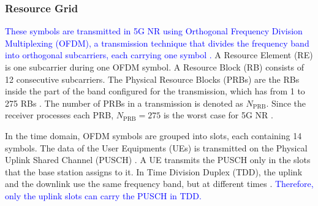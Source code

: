 \subsubsection{Resource Grid}\label{subsubsec:grade-recursos}
\textcolor{blue}{These symbols are transmitted in 5G NR using Orthogonal Frequency Division Multiplexing (OFDM), a transmission technique that divides the frequency band into orthogonal subcarriers, each carrying one symbol \cite{tse-viswanath}.} A Resource Element (RE) is one subcarrier during one OFDM symbol. A Resource Block (RB) consists of 12 consecutive subcarriers. The Physical Resource Blocks (PRBs) are the RBs inside the part of the band configured for the transmission, which has from 1 to 275 RBs \cite{3gpp-ts38211, lin-lee-5g}. The number of PRBs in a transmission is denoted as $N_{\text{PRB}}$. Since the receiver processes each PRB, $N_{\text{PRB}} = 275$ is the worst case for 5G NR \cite{zhao2025jsac}.

In the time domain, OFDM symbols are grouped into slots, each containing 14 symbols. The data of the User Equipments (UEs) is transmitted on the Physical Uplink Shared Channel (PUSCH) \cite{3gpp-ts38211}. A UE transmits the PUSCH only in the slots that the base station assigns to it. In Time Division Duplex (TDD), the uplink and the downlink use the same frequency band, but at different times \cite{lin-lee-5g}. \textcolor{blue}{Therefore, only the uplink slots can carry the PUSCH in TDD.}
